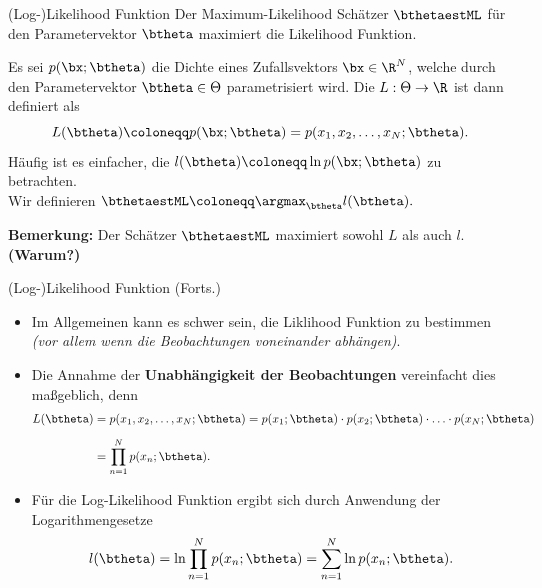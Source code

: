 \begin{frame}{(Log-)Likelihood Funktion}{}
	Der Maximum-Likelihood Schätzer $\bthetaestML$ für den Parametervektor $\btheta$ maximiert die Likelihood Funktion.
	
	\begin{mydef}
		Es sei $p(\bx; \btheta)$ die Dichte eines Zufallsvektors $\bx \in \R^N$, welche durch den
		Parametervektor $\btheta \in \Theta$ parametrisiert wird.
		Die  $L : \Theta \rightarrow \R$ ist dann definiert als
		\begin{equation*}
			L(\btheta) \coloneqq p(\bx; \btheta) = p(x_1, x_2, \ldots, x_N; \btheta).
		\end{equation*}
		Häufig ist es einfacher, die  $l(\btheta) \coloneqq \ln p(\bx; \btheta)$ zu betrachten. \\
		Wir definieren $\bthetaestML \coloneqq \argmax_{\btheta} l(\btheta).$
	\end{mydef}

	\begin{boxGray}
		\textbf{Bemerkung:} Der Schätzer $\bthetaestML$ maximiert sowohl $L$ als auch $l$. \textbf{(Warum?)}
	\end{boxGray}
\end{frame}


\begin{frame}{(Log-)Likelihood Funktion (Forts.)}{}
	\begin{itemize}
		\item Im Allgemeinen kann es schwer sein, die Liklihood Funktion zu bestimmen
			\textit{(vor allem wenn die Beobachtungen voneinander abhängen)}.
		\item Die Annahme der \textbf{Unabhängigkeit der Beobachtungen} vereinfacht dies maßgeblich, denn
		\begin{align*}
			L(\btheta)
				&= p(x_1, x_2, \ldots, x_N; \btheta)
					= p(x_1; \btheta) \cdot p(x_2; \btheta) \cdot \ldots \cdot p(x_N; \btheta)
			\\[2mm]
				&= \prod_{n=1}^N p(x_n; \btheta).
		\end{align*}
		\item Für die Log-Likelihood Funktion ergibt sich durch Anwendung der Logarithmengesetze
		$$l(\btheta) = \ln \prod_{n=1}^N p(x_n; \btheta) = \sum_{n=1}^N \ln p(x_n; \btheta).$$
	\end{itemize}
\end{frame}


